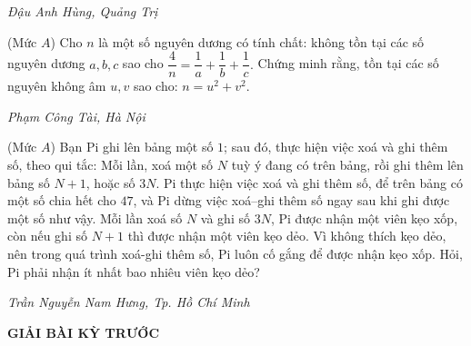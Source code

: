 \begin{multicols}{2}
\begin{figure}[H]
		\vspace*{-15pt}
	\end{figure}
	\begin{flushright}
		\textit{Đậu Anh Hùng, Quảng Trị}
	\end{flushright}
	{}
	(Mức $A$) Cho $n$ là một số nguyên dương có tính chất: không tồn tại các số nguyên dương $a,b,c$ sao cho $\dfrac4n=\dfrac 1a+\dfrac 1b+\dfrac 1c.$ Chứng minh rằng, tồn tại các số nguyên không âm $u,v$ sao cho: $n=u^2+v^2$.  
	\begin{flushright}
		\textit{Phạm Công Tài, Hà Nội}
	\end{flushright}
	{}
	(Mức $A$) Bạn Pi ghi lên bảng một số $1$; sau đó, thực hiện việc xoá và ghi thêm số, theo qui tắc:  Mỗi lần, xoá một số $N$ tuỳ ý đang có trên bảng, rồi ghi thêm lên bảng số $N+1$,  hoặc số $3N$.
	\vskip 0.05cm
	Pi thực hiện việc xoá và ghi thêm số, để trên bảng có một số chia hết cho $47$, và Pi dừng việc xoá--ghi thêm số ngay sau khi ghi được một số như vậy. 
	\vskip 0.05cm
	Mỗi lần xoá số $N$ và ghi số $3N$, Pi được nhận một viên kẹo xốp, còn nếu ghi số $N+1$ thì được nhận một viên kẹo dẻo. Vì không thích kẹo dẻo, nên trong quá trình xoá-ghi thêm số, Pi luôn cố gắng để được nhận kẹo xốp. Hỏi, Pi phải nhận ít nhất bao nhiêu viên kẹo dẻo? 
	\begin{flushright}
		\textit{Trần Nguyễn Nam Hưng, Tp. Hồ Chí Minh}
	\end{flushright}
\end{multicols}
\begin{center}
	{\large{\textbf{\color{thachthuctoanhoc}GIẢI BÀI KỲ TRƯỚC}}}
\end{center}
